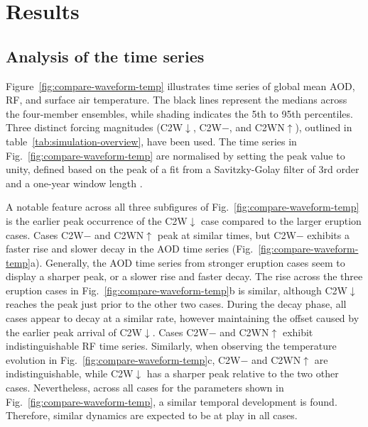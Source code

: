 \documentclass[draft]{agujournal2019}
\newcommand{\cwmp}{C2W\(-\)}
\newcommand{\cwm}{C2W\(\downarrow\)}
\newcommand{\cws}{C2WN\(\uparrow\)}
\begin{document}
\section{Results}\label{sec:results}


\subsection{Analysis of the time series}

Figure~\ref{fig:compare-waveform-temp} illustrates time series of global mean AOD, RF,
and surface air temperature. The black lines represent the medians across the
four-member ensembles, while shading indicates the 5th to 95th percentiles. Three
distinct forcing magnitudes (\cwm{}, \cwmp{}, and \cws{}), outlined in
table~\ref{tab:simulation-overview}, have been used. The time series in
Fig.~\ref{fig:compare-waveform-temp} are normalised by setting the peak value to unity,
defined based on the peak of a fit from a Savitzky-Golay filter of 3rd order and a
one-year window length \cite{savitzky1964}.

A notable feature across all three subfigures of Fig.~\ref{fig:compare-waveform-temp} is
the earlier peak occurrence of the \cwm{} case compared to the larger eruption cases.
Cases \cwmp{} and \cws{} peak at similar times, but \cwmp{} exhibits a faster rise and
slower decay in the AOD time series (Fig.~\ref{fig:compare-waveform-temp}a). Generally,
the AOD time series from stronger eruption cases seem to display a sharper peak, or a
slower rise and faster decay. The rise across the three eruption cases in
Fig.~\ref{fig:compare-waveform-temp}b is similar, although \cwm{} reaches the peak just
prior to the other two cases. During the decay phase, all cases appear to decay at a
similar rate, however maintaining the offset caused by the earlier peak arrival of
\cwm{}. Cases \cwmp{} and \cws{} exhibit indistinguishable RF time series. Similarly,
when observing the temperature evolution in Fig.~\ref{fig:compare-waveform-temp}c,
\cwmp{} and \cws{} are indistinguishable, while \cwm{} has a sharper peak relative to
the two other cases. Nevertheless, across all cases for the parameters shown in
Fig.~\ref{fig:compare-waveform-temp}, a similar temporal development is found.
Therefore, similar dynamics are expected to be at play in all cases.
\end{document}
